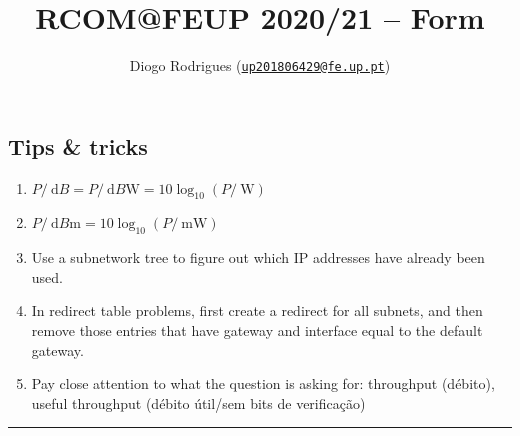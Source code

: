 \documentclass{form}
\author{Diogo Rodrigues (\texttt{\href{mailto:up201806429@fe.up.pt}{up201806429@fe.up.pt}})}
\title{RCOM@FEUP 2020/21 -- Form}
\begin{document}
    

\begin{multicols}{2}
    \section*{Tips \& tricks}
    \begin{enumerate}
        \setlength\itemsep{0em}
        \item $P/\SI{}{\deci B} = P/\SI{}{\deci B \watt} = 10 \log_{10}{(P/\SI{}{\watt})}$
        \item $P/\SI{}{\deci B \milli} = 10 \log_{10}{(P/\SI{}{\milli\watt})}$
        \item Use a subnetwork tree to figure out which IP addresses have already been used.
        \item In redirect table problems, first create a redirect for all subnets, and then remove those entries that have gateway and interface equal to the default gateway.
        \item Pay close attention to what the question is asking for: throughput (débito), useful throughput (débito útil/sem bits de verificação)
    \end{enumerate}
\end{multicols}

\vspace{-1.5em}\noindent\rule{\textwidth}{1.0pt}\vspace{-0em}
\end{document}
